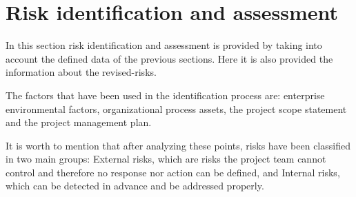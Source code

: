 \section{Risk identification and assessment}

In this section risk identification and assessment is provided by taking into account the defined data of the previous sections. Here it is also provided the information about the revised-risks. 

The factors that have been used in the identification process are: enterprise environmental factors, organizational process assets, the project scope statement and the project management plan.

It is worth to mention that after analyzing these points, risks have been classified in two main groups: External risks, which are risks the project team cannot control and therefore no response nor action can be defined, and Internal risks, which can be detected in advance and be addressed properly.

